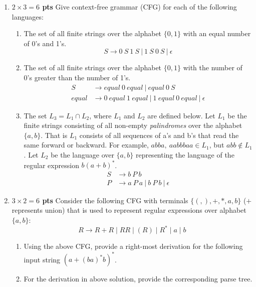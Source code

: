 \documentclass[10pt]{article}
\newcommand {\pts}[1]{{\bf #1 pts}}
\begin{document}
\begin{enumerate}
  \item  \pts{$2\times 3= 6$} Give context-free grammar (CFG) for each of the following languages:
  \begin{enumerate}
           \item The set of all finite strings over the alphabet $\{0,1\}$ with an equal number of 0's and 1's.
            \[
            S \rightarrow 0\ S\ 1\ S\ |\ 1\ S\ 0\ S\ |\  \epsilon
            \]
           \item The set of all finite strings over the alphabet $\{0,1\}$ with the number of 0's greater than the number of 1's.
           \begin{align*}
               S       &\rightarrow equal\ 0\ equal\ |\  equal\ 0\ S\\
               equal   &\rightarrow 0\ equal\ 1\ equal\
                        |\ 1\ equal\ 0\ equal\
                        |\ \epsilon
           \end{align*}
           \item The set $L_3=L_1\cap L_2$, where $L_1$ and $L_2$ are defined below.
           Let $L_1$ be the finite strings consisting of all non-empty \emph{palindromes} over the alphabet $\{a,b\}$. That is $L_1$
           consists of all sequences of a's and b's that read the same forward or backward. For example, $abba,~aabbbaa\in L_1$, but $abb\not\in L_1$.
           Let $L_2$ be the language over  $\{a,b\}$ representing the language of the regular expression $b(a+b)^\ast$.
           \begin{align*}
               S    &\rightarrow b\ P\ b \\
               P    &\rightarrow a\ P\ a\ |\ b\ P\ b\ |\ \epsilon
           \end{align*}
  \end{enumerate}
  \item \pts{$3\times 2= 6$} Consider the following CFG with terminals $\{(,),+,*,a,b\}$ ($+$ represents union) that is used to represent
regular expressions over alphabet $\{a, b\}$:
\[R\rightarrow R+R \mid RR\mid (R)\mid R^\ast \mid a\mid b\]
\begin{enumerate}
  \item Using the above CFG, provide a right-most derivation for the following input string $(a+(ba)^\ast b)^\ast$.
            \[
            \]
  \item For the derivation in above solution, provide the corresponding parse tree.
            \[
            \]
\end{enumerate}




\end{enumerate}
\end{document}
